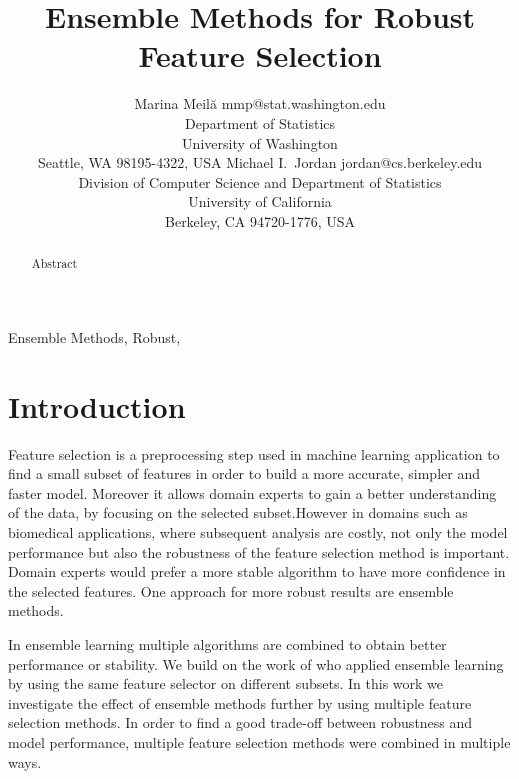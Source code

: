 \documentclass[twoside,11pt]{article}
\begin{document}
\title{Ensemble Methods for Robust Feature Selection}

\author{\name Marina Meil\u{a} \email mmp@stat.washington.edu \\
       \addr Department of Statistics\\
       University of Washington\\
       Seattle, WA 98195-4322, USA
       \AND
       \name Michael I.\ Jordan \email jordan@cs.berkeley.edu \\
       \addr Division of Computer Science and Department of Statistics\\
       University of California\\
       Berkeley, CA 94720-1776, USA}


\maketitle

\begin{abstract}%
  Abstract
\end{abstract}

\begin{keywords}
  Ensemble Methods, Robust, 
\end{keywords}

\section{Introduction}

Feature selection is a preprocessing step used in machine learning application to find
a small subset of features in order to build a more accurate, simpler and faster model.
Moreover it allows domain experts to gain a better understanding of the data, by focusing
on the selected subset.However in domains such as biomedical applications, 
where subsequent analysis are costly, not only the model performance but also the robustness
of the feature selection method is important. Domain experts would prefer a more stable
algorithm to have more confidence in the selected features. One approach for more robust
results are ensemble methods.

In ensemble learning multiple algorithms are combined to obtain better performance or stability.
We build on the work of \cite{saeys2008} who applied ensemble learning by using
the same feature selector on different subsets. In this work we investigate the effect of ensemble methods
further by using multiple feature selection methods. 
In order to find a good trade-off between robustness and model performance, multiple feature selection methods were
combined in multiple ways.
\end{document}
